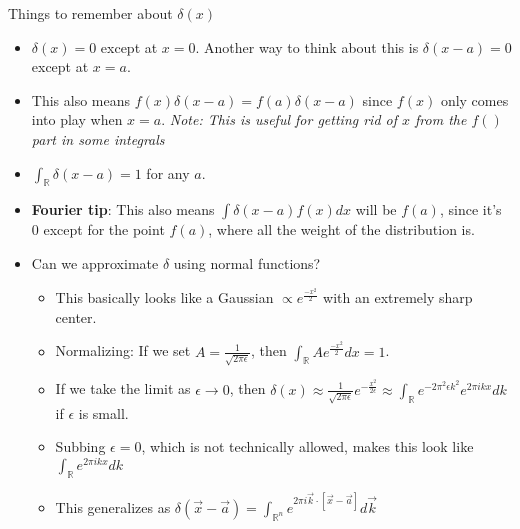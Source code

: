 \documentclass[11pt, oneside]{article}   	%
\begin{document}
Things to remember about $\delta(x)$
\begin{itemize}
\item  $\delta(x) = 0$ except at $x=0$.  Another way to think about this is $\delta(x - a) = 0$ except at $x=a$. 
\item This also means $f(x)\delta(x-a)= f(a)\delta(x-a)$ since $f(x)$ only comes into play when $x=a$.  \emph{Note: This is useful for getting rid of $x$ from the $f()$ part in some integrals}
\item $\int_{\mathbb{R}} \delta(x-a) = 1$ for any $a$.  
\item \textbf{Fourier tip}: This also means $\int \delta(x-a)f(x)dx$ will be $f(a)$, since it's 0 except for the point $f(a)$, where all the weight of the distribution is.
\item Can we approximate $\delta$ using normal functions?

\begin{itemize}
\item This basically looks like a Gaussian $\propto e^{\frac{-x^2}{2}}$ with an extremely sharp center.
\item Normalizing: If we set $A = \frac{1}{\sqrt{2\pi \epsilon}}$, then $\int_{\mathbb{R}} Ae^{\frac{-x^2}{2}} dx = 1$.
\item If we take the limit as $\epsilon \rightarrow 0$, then $\delta(x) \approx \frac{1}{\sqrt{2 \pi \epsilon}} e^{-\frac{x^2}{2\epsilon}}
   \approx \int_{\mathbb{R}} e^{-2\pi^2\epsilon k^2}e^{2\pi i k x}dk$ if $\epsilon$ is small.
\item Subbing $\epsilon = 0$, which is not technically allowed, makes this look like $\int_{\mathbb{R}} e^{2\pi i k x } dk$
\item This generalizes as $\delta(\vec{x} - \vec{a}) = \int_{\mathbb{R}^n} e^{2\pi i \vec{k} \cdot [\vec{x} - \vec{a}] } d\vec{k}$
\end{itemize}
\end{itemize}
\end{document}
